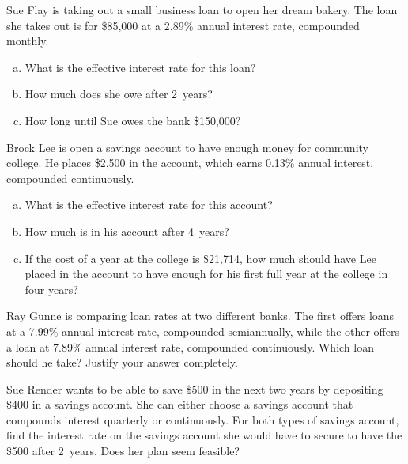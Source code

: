 \documentclass[11pt,letterpaper]{article}
\begin{document}
\newpage



 Sue Flay is taking out a small business loan to open her dream bakery. The loan she takes out is for \$85,000 at a 2.89\% annual interest rate, compounded monthly.
	\begin{enumerate}[(a)]
	\item What is the effective interest rate for this loan?
	\item How much does she owe after 2~years?
	\item How long until Sue owes the bank \$150,000?
	\end{enumerate}



\newpage



 Brock Lee is open a savings account to have enough money for community college. He places \$2,500 in the account, which earns 0.13\% annual interest, compounded continuously.
	\begin{enumerate}[(a)]
	\item What is the effective interest rate for this account?
	\item How much is in his account after 4~years?
	\item If the cost of a year at the college is \$21,714, how much should have Lee placed in the account to have enough for his first full year at the college in four years?
	\end{enumerate}



\newpage



 Ray Gunne is comparing loan rates at two different banks. The first offers loans at a 7.99\% annual interest rate, compounded semiannually, while the other offers a loan at 7.89\% annual interest rate, compounded continuously. Which loan should he take? Justify your answer completely.



\newpage



 Sue Render wants to be able to save \$500 in the next two years by depositing \$400 in a savings account. She can either choose a savings account that compounds interest quarterly or continuously. For both types of savings account, find the interest rate on the savings account she would have to secure to have the \$500 after 2~years. Does her plan seem feasible? 
\end{document}
